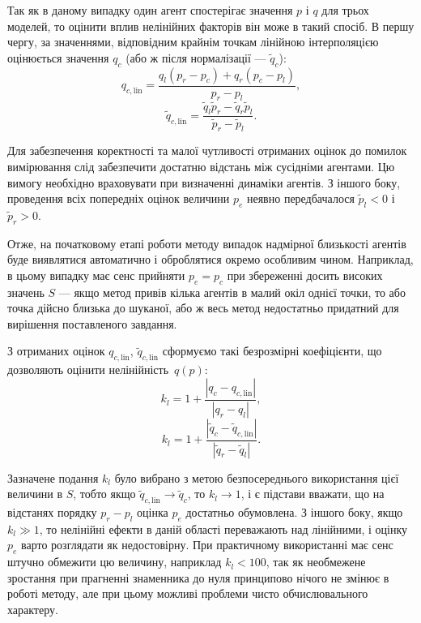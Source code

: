Так як в даному випадку один агент спостерігає значення
$p$ і
$q$ для трьох моделей, то оцінити вплив нелінійних факторів він
може в такий спосіб. В першу чергу, за значеннями, відповідним
крайнім точкам лінійною інтерполяцією оцінюється значення
$q_c$ (або ж після нормалізації ---
$ \tilde{q}_c $):
%
\begin{equation}
 q_{c,\mathrm{lin}}
  =
  \frac{  q_l \left( p_r - p_c \right) + q_r \left( p_c - p_l \right) }{p_r-p_l},
  \label{atu:eq:q_clin}
\end{equation}
%
\begin{equation}
  \tilde{q}_{c,\mathrm{lin}}
  =
  \frac{ \tilde{q}_l \tilde{p}_r - \tilde{q}_r \tilde{p}_l }{\tilde{p}_r-\tilde{p}_l}  .
  \label{atu:eq:qr_clin}
\end{equation}

Для забезпечення коректності та малої чутливості отриманих
оцінок до помилок вимірювання слід забезпечити достатню
відстань між сусідніми агентами. Цю вимогу необхідно
враховувати при визначенні динаміки агентів. З іншого боку,
проведення всіх попередніх оцінок величини
$ p_e $ неявно передбачалося
$ \tilde{p}_l <0 $ і
$ \tilde{p}_r> 0 $.

Отже, на початковому етапі роботи методу випадок надмірної
близькості агентів буде виявлятися автоматично і оброблятися
окремо особливим чином. Наприклад, в цьому випадку має сенс
прийняти
$ p_e = p_c $ при збереженні досить високих значень
$ S $ --- якщо метод привів кілька агентів в малий окіл однієї
точки, то або точка дійсно близька до шуканої, або ж весь метод
недостатньо придатний для вирішення поставленого завдання.


З отриманих оцінок
$ q_{c, \mathrm{lin}} $,
$ \tilde{q}_{c, \mathrm{lin}} $
сформуємо такі безрозмірні коефіцієнти, що
дозволяють оцінити нелінійність~$q(p)$:
%
\begin{equation}
  k_l = 1 + \frac{|q_c - q_{c,\mathrm{lin}}|}{|q_r-q_l|} ,
  \label{atu:eq:k_l1}
\end{equation}
%
\begin{equation}
  k_l = 1 + \frac{|\tilde{q}_c - \tilde{q}_{c,\mathrm{lin}}|}{ |\tilde{q}_r-\tilde{q}_l|} .
  \label{atu:eq:k_l2}
\end{equation}

Зазначене подання
$ k_l $ було вибрано з метою безпосереднього використання цієї
величини в
$ S $, тобто якщо
$ \tilde{q}_{c, \mathrm{lin}} \to \tilde{q}_c $, то
$ k_l \to 1 $, і є підстави вважати, що на відстанях порядку
$ p_r-p_l $ оцінка
$ p_e $ достатньо обумовлена. З іншого боку, якщо
$ k_l \gg 1 $, то нелінійні ефекти в даній області переважають над
лінійними, і оцінку
$p_e$ варто розглядати як недостовірну. При практичному
використанні має сенс штучно обмежити цю величину, наприклад
$ k_l <100 $, так як необмежене зростання при прагненні знаменника
до нуля принципово нічого не змінює в роботі методу, але при
цьому можливі проблеми чисто обчислювального характеру.



